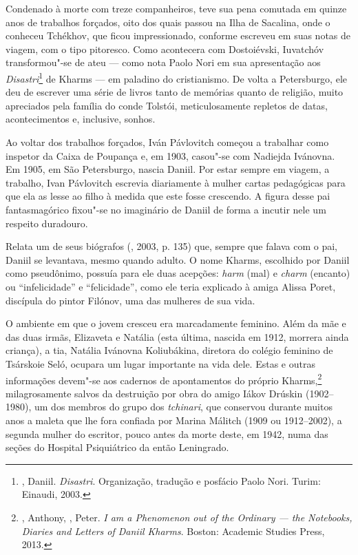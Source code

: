 Condenado à morte com treze companheiros, teve sua pena comutada
em quinze anos de trabalhos forçados, oito dos quais passou na
Ilha de Sacalina, onde o conheceu Tchékhov, que ficou impressionado,
conforme escreveu em suas notas de viagem, com o tipo pitoresco.
Como acontecera com Dostoiévski, Iuvatchóv transformou"-se de ateu
--- como nota Paolo Nori em sua apresentação aos
\emph{Disastri}\footnote{, Daniil.
\emph{Disastri}. Organização, tradução e posfácio Paolo Nori.
Turim: Einaudi, 2003.} de Kharms --- em paladino do cristianismo.
De volta a Petersburgo, ele deu de escrever uma série de livros
tanto de memórias quanto de religião, muito apreciados pela
família do conde Tolstói, meticulosamente repletos de datas,
acontecimentos e, inclusive, sonhos.

Ao voltar dos trabalhos forçados, Iván Pávlovitch começou a
trabalhar como inspetor da Caixa de Poupança e, em 1903, casou"-se
com Nadiejda Ivánovna. Em 1905, em São Petersburgo, nascia Daniil.
Por estar sempre em viagem, a trabalho, Ivan Pávlovitch escrevia
diariamente à mulher cartas pedagógicas para que ela as lesse ao
filho à medida que este fosse crescendo. A figura desse pai
fantasmagórico fixou"-se no imaginário de Daniil de forma a
incutir nele um respeito duradouro.

Relata um de seus biógrafos (, 2003, p. 135) que, sempre
que falava com o pai, Daniil se levantava, mesmo quando adulto.
O nome Kharms, escolhido por Daniil como pseudônimo, possuía para
ele duas acepções: \emph{harm} (mal) e \emph{charm} (encanto) ou
``infelicidade'' e ``felicidade'', como ele teria explicado à
amiga Alissa Poret, discípula do pintor Filónov, uma das mulheres
de sua vida.

O ambiente em que o jovem cresceu era marcadamente feminino. Além
da mãe e das duas irmãs, Elizaveta e Natália (esta última, nascida
em 1912, morrera ainda criança), a tia, Natália Ivánovna Koliubákina,
diretora do colégio feminino de Tsárskoie Seló, ocupara um lugar
importante na vida dele. Estas e outras informações devem"-se aos
cadernos de apontamentos do próprio Kharms,\footnote{,
Anthony, , Peter. \emph{I am a Phenomenon out of the
Ordinary --- the Notebooks, Diaries and Letters of Daniil Kharms}.
Boston: Academic Studies Press, 2013.} milagrosamente salvos da
destruição por obra do amigo Iákov Drúskin (1902--1980), um dos membros do
grupo dos \emph{tchinari}, que conservou durante muitos anos a maleta
que lhe fora confiada por Marina Málitch (1909 ou 1912--2002), a
segunda mulher do escritor, pouco antes da morte deste, em 1942,
numa das seções do Hospital Psiquiátrico da então Leningrado.

